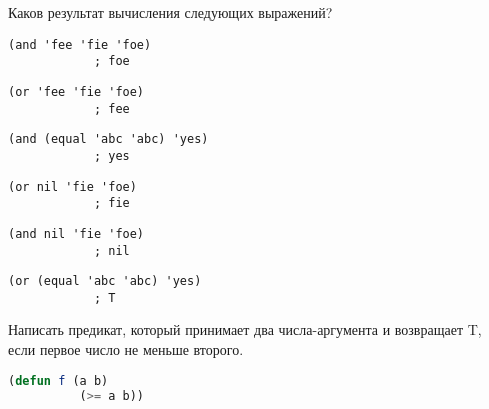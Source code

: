 \documentclass[a4paper,oneside,12pt]{extreport}
\begin{document}
\begin{task}
	Каков результат вычисления следующих выражений?
	\begin{AutoMultiColEnumerate}
		\item \begin{lstlisting}[style=lispinline, gobble=24]
			(and 'fee 'fie 'foe)
			; foe
		\end{lstlisting}

		\item \begin{lstlisting}[style=lispinline, gobble=24]
			(or 'fee 'fie 'foe)
			; fee
		\end{lstlisting}

		\item \begin{lstlisting}[style=lispinline, gobble=24]
			(and (equal 'abc 'abc) 'yes)
			; yes
		\end{lstlisting}

		\item \begin{lstlisting}[style=lispinline, gobble=24]
			(or nil 'fie 'foe)
			; fie
		\end{lstlisting}

		\item \begin{lstlisting}[style=lispinline, gobble=24]
			(and nil 'fie 'foe)
			; nil
		\end{lstlisting}

		\item \begin{lstlisting}[style=lispinline, gobble=24]
			(or (equal 'abc 'abc) 'yes)
			; T
		\end{lstlisting}
	\end{AutoMultiColEnumerate}
\end{task}

\begin{task}
	Написать предикат, который принимает два числа-аргумента и возвращает T, если первое число не меньше второго.

	\begin{lstlisting}[language=Lisp, gobble=16]
		(defun f (a b)
		  (>= a b))
	\end{lstlisting}
\end{task}
\end{document}
